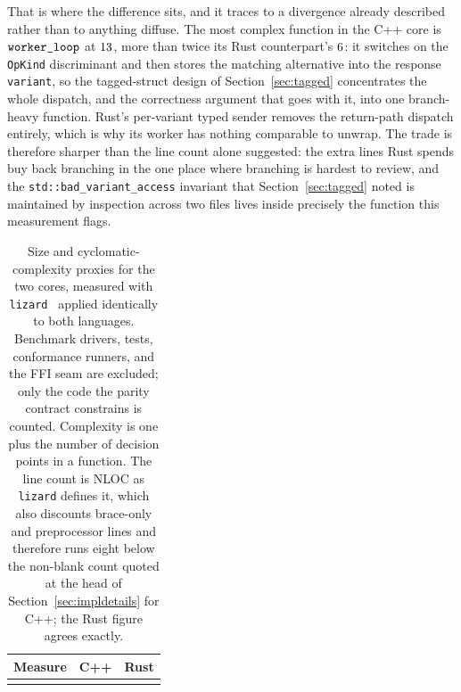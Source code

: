 \documentclass[english,twoside,openright,a4paper,censored,csm,software-track-2020]{HYthesisML}
\begin{document}
That is where the difference sits, and it traces to a divergence already described rather than
to anything diffuse. The most complex function in the C++ core is
$\texttt{worker\_loop}$ at $13$, more than twice its Rust counterpart's $6$: it
switches on the \texttt{OpKind} discriminant and then stores the matching alternative into the
response \texttt{variant}, so the tagged-struct design of Section~\ref{sec:tagged} concentrates
the whole dispatch, and the correctness argument that goes with it, into one branch-heavy
function. Rust's per-variant typed sender removes the return-path dispatch entirely, which is
why its worker has nothing comparable to unwrap. The trade is therefore sharper than the line
count alone suggested: the extra lines Rust spends buy back branching in the one place where
branching is hardest to review, and the \texttt{std::bad\_variant\_access} invariant that
Section~\ref{sec:tagged} noted is maintained by inspection across two files lives inside
precisely the function this measurement flags.

\begin{table}
\centering
\small
\caption{Size and cyclomatic-complexity proxies for the two cores, measured with
\texttt{lizard}~\cite{lizard} applied identically to both languages. Benchmark drivers, tests,
conformance runners, and the FFI seam are excluded; only the code the parity contract
constrains is counted. Complexity is one plus the number of decision points in a function.
The line count is NLOC as \texttt{lizard} defines it, which also discounts brace-only and
preprocessor lines and therefore runs eight below the non-blank count quoted at the head of
Section~\ref{sec:impldetails} for C++; the Rust figure agrees
exactly.\label{tab:complexity}}
\begin{tabular}{@{}l r r@{}}
\hline\hline
Measure & C++ & Rust \\
\hline
\\
\hline
\end{tabular}
\end{table}
\end{document}
